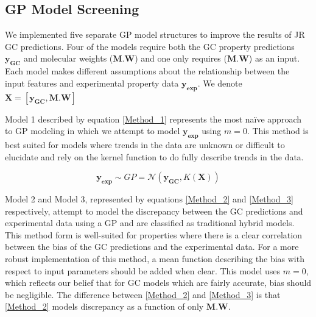 \documentclass[journal=jacsat,manuscript=article]{achemso}
\begin{document}


\subsection{GP Model Screening}
We implemented five separate GP model structures to improve the results of JR GC predictions. Four of the models require both the GC property predictions $\mathbf{y_{GC}}$ and molecular weights ($\mathbf{M.W}$) and one only requires ($\mathbf{M.W}$) as an input. Each model makes different assumptions about the relationship between the input features and experimental property data $\mathbf{y_{\text{exp}}}$. We denote $\mathbf{X} = [\mathbf{y_{GC}}, \mathbf{M.W}]$

Model 1 described by equation \eqref{Method_1} represents the most na\"ive approach to GP modeling in which we attempt to model $\mathbf{y_{\text{exp}}}$ using $m=0$. This method is best suited for models where trends in the data are unknown or difficult to elucidate and rely on the kernel function to do fully describe trends in the data.

\begin{equation}
    \mathbf{y_{\text{exp}}} \sim  GP = \mathcal{N}\left(\mathbf{y_{GC}}, K(\mathbf{X}) \right)
    \label{Method_1}
\end{equation}

Model 2 and Model 3, represented by equations \eqref{Method_2} and \eqref{Method_3} respectively, attempt to model the discrepancy between the GC predictions and experimental data using a GP and are classified as traditional hybrid models. This method form is well-suited for properties where there is a clear correlation between the bias of the GC predictions and the experimental data. For a more robust implementation of this method, a mean function describing the bias with respect to input parameters should be added when clear. This model uses $m=0$, which reflects our belief that for GC models which are fairly accurate, bias should be negligible. The difference between \eqref{Method_2} and \eqref{Method_3} is that \eqref{Method_2} models discrepancy as a function of only $\mathbf{M.W}$.
\end{document}

